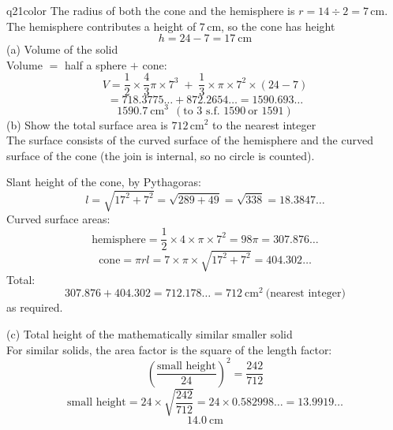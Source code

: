 \documentclass[11pt,a4paper]{article}
\begin{document}
\begin{ansbox}{q21color}
The radius of both the cone and the hemisphere is $r = 14 \div 2 = 7\,$cm. The hemisphere contributes a height of $7\,$cm, so the cone has height
\[
h = 24 - 7 = 17\ \text{cm}
\]
(a) Volume of the solid\\[4pt]
Volume $=$ half a sphere $+$ cone:
\[
V = \frac{1}{2}\times\frac{4}{3}\pi\times 7^3 \;+\; \frac{1}{3}\times\pi\times 7^2 \times (24-7)
\]
\[
= 718.3775\ldots + 872.2654\ldots = 1590.693\ldots
\]
\[
\boxed{1590.7\ \text{cm}^3}\ \ (\text{to 3 s.f. } 1590\ \text{or } 1591)
\]
(b) Show the total surface area is $712\,$cm$^2$ to the nearest integer\\[4pt]
The surface consists of the curved surface of the hemisphere and the curved surface of the cone (the join is internal, so no circle is counted).

Slant height of the cone, by Pythagoras:
\[
l = \sqrt{17^2 + 7^2} = \sqrt{289 + 49} = \sqrt{338} = 18.3847\ldots
\]
Curved surface areas:
\[
\text{hemisphere} = \frac{1}{2}\times 4 \times \pi \times 7^2 = 98\pi = 307.876\ldots
\]
\[
\text{cone} = \pi r l = 7 \times \pi \times \sqrt{17^2 + 7^2} = 404.302\ldots
\]
Total:
\[
307.876 + 404.302 = 712.178\ldots = \boxed{712\ \text{cm}^2}\ \text{(nearest integer)}
\]
as required.

(c) Total height of the mathematically similar smaller solid\\[4pt]
For similar solids, the area factor is the square of the length factor:
\[
\left(\frac{\text{small height}}{24}\right)^2 = \frac{242}{712}
\]
\[
\text{small height} = 24 \times \sqrt{\frac{242}{712}} = 24 \times 0.582998\ldots = 13.9919\ldots
\]
\[
\boxed{14.0\ \text{cm}}
\]
\end{ansbox}
\end{document}
